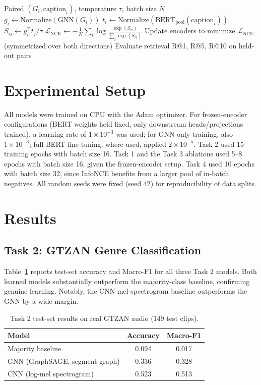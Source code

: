 \documentclass[conference]{IEEEtran}
\begin{document}
\begin{algorithm}[h]
\caption{Task 4: Contrastive GNN-BERT (Tag-Based Pseudo-Captions)}
\begin{algorithmic}[1]
\Require Paired $(G_i, \text{caption}_i)$, temperature $\tau$, batch size $N$
  \State $g_i \gets \text{Normalize}(\text{GNN}(G_i))$
  \State $t_i \gets \text{Normalize}(\text{BERT}_{\text{pool}}(\text{caption}_i))$
  \State $S_{ij} \gets g_i^\top t_j / \tau$
  \State $\mathcal{L}_{\text{NCE}} \gets -\frac{1}{N}\sum_i \log \frac{\exp(S_{ii})}{\sum_j \exp(S_{ij})}$
  \State Update encoders to minimize $\mathcal{L}_{\text{NCE}}$ (symmetrized over both directions)
\EndFor
\State Evaluate retrieval R@1, R@5, R@10 on held-out pairs
\end{algorithmic}
\end{algorithm}

\section{Experimental Setup}
All models were trained on CPU with the Adam optimizer. For frozen-encoder configurations (BERT weights held fixed, only downstream heads/projections trained), a learning rate of $1\times10^{-3}$ was used; for GNN-only training, also $1\times10^{-3}$; full BERT fine-tuning, where used, applied $2\times10^{-5}$. Task 2 used 15 training epochs with batch size 16. Task 1 and the Task 3 ablations used 5--8 epochs with batch size 16, given the frozen-encoder setup. Task 4 used 10 epochs with batch size 32, since InfoNCE benefits from a larger pool of in-batch negatives. All random seeds were fixed (seed 42) for reproducibility of data splits.

\section{Results}

\subsection{Task 2: GTZAN Genre Classification}
\label{sec:task2results}
Table~\ref{tab:task2} reports test-set accuracy and Macro-F1 for all three Task 2 models. Both learned models substantially outperform the majority-class baseline, confirming genuine learning. Notably, the CNN mel-spectrogram baseline outperforms the GNN by a wide margin.

\begin{table}[h]
\caption{Task 2 test-set results on real GTZAN audio (149 test clips).}
\label{tab:task2}
\centering
\begin{tabular}{lcc}
\toprule
\textbf{Model} & \textbf{Accuracy} & \textbf{Macro-F1} \\
\midrule
Majority baseline & 0.094 & 0.017 \\
GNN (GraphSAGE, segment graph) & 0.336 & 0.328 \\
CNN (log-mel spectrogram) & 0.523 & 0.513 \\
\bottomrule
\end{tabular}
\end{table}
\end{document}
